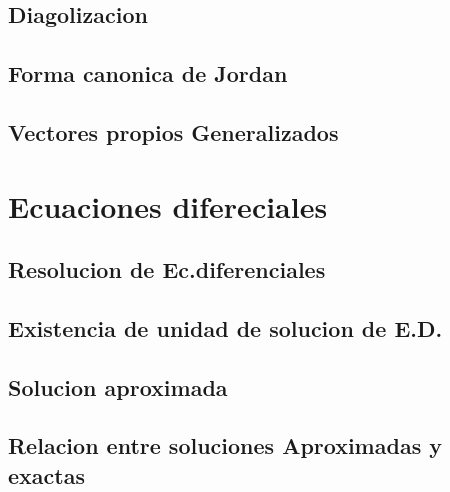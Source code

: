 \documentclass{tufte-book}
\numberwithin{equation}{chapter}
\begin{document}
    \chapter{Diagolizacion}
    \chapter{Forma canonica de Jordan}
    \chapter{Vectores propios Generalizados}
  \part{Ecuaciones difereciales}
    \chapter{Resolucion de Ec.diferenciales}
    \chapter{Existencia de unidad de solucion de E.D.}
    \chapter{Solucion aproximada}
    \chapter{Relacion entre soluciones Aproximadas y exactas}
\end{document}
